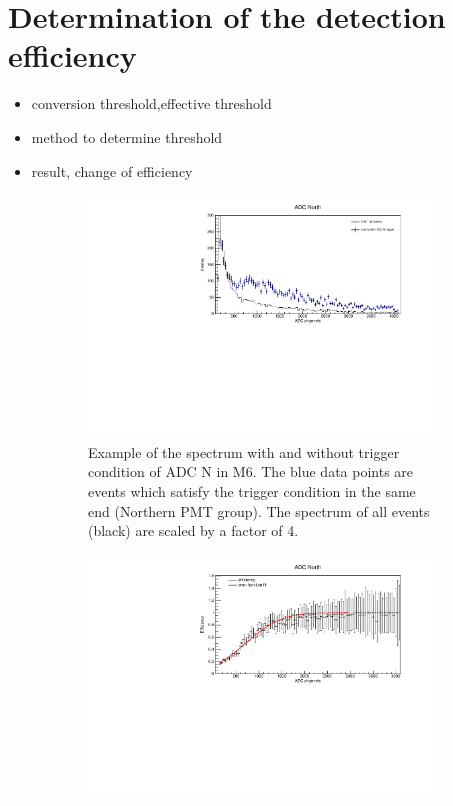 \section{Determination of the detection efficiency}


\begin{itemize}
  \item conversion threshold,effective threshold
  \item method to determine threshold
  \item result, change of efficiency
\end{itemize}

\begin{figure}[ht]
  \centering
  \begin{subfigure}{0.7\linewidth}
    \includegraphics[width=\linewidth{}]{./fig/M6AdcNorth2Histo.pdf}
    \caption{Example of the spectrum with and without trigger condition of ADC N in M6. The blue data points are events which satisfy the trigger condition in the same end (Northern PMT group). The spectrum of all events (black) are scaled by a factor of 4.}
    \label{fig:2HistoM6}
  \end{subfigure}
  \begin{subfigure}{0.7\linewidth}
    \includegraphics[width=\linewidth{}]{./fig/M6AdcNortheff_late.pdf}
    \caption{}
    \label{fig:eff_lateM6}
  \end{subfigure}
\end{figure}

